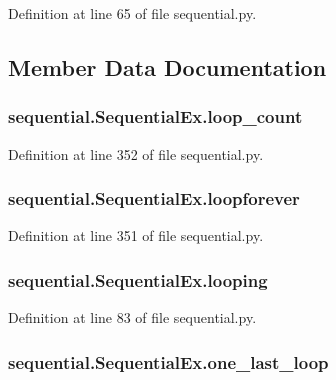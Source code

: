 Definition at line 65 of file sequential.\-py.



\subsection{Member Data Documentation}
\hypertarget{classsequential_1_1SequentialEx_a4ba41b6f01a147966df8df335d570d22}{
\subsubsection[{loop\-\_\-count}]{\setlength{\rightskip}{0pt plus 5cm}sequential.\-Sequential\-Ex.\-loop\-\_\-count}}\label{classsequential_1_1SequentialEx_a4ba41b6f01a147966df8df335d570d22}


Definition at line 352 of file sequential.\-py.

\hypertarget{classsequential_1_1SequentialEx_a8cf719781ed7aa81bb27e30d4281cb66}{
\subsubsection[{loopforever}]{\setlength{\rightskip}{0pt plus 5cm}sequential.\-Sequential\-Ex.\-loopforever}}\label{classsequential_1_1SequentialEx_a8cf719781ed7aa81bb27e30d4281cb66}


Definition at line 351 of file sequential.\-py.

\hypertarget{classsequential_1_1SequentialEx_a548a626b1a098a7ad2e0709fc97fa8f7}{
\subsubsection[{looping}]{\setlength{\rightskip}{0pt plus 5cm}sequential.\-Sequential\-Ex.\-looping}}\label{classsequential_1_1SequentialEx_a548a626b1a098a7ad2e0709fc97fa8f7}


Definition at line 83 of file sequential.\-py.

\hypertarget{classsequential_1_1SequentialEx_a3dbe6e22b44436f3fef2c114550ad8ca}{
\subsubsection[{one\-\_\-last\-\_\-loop}]{\setlength{\rightskip}{0pt plus 5cm}sequential.\-Sequential\-Ex.\-one\-\_\-last\-\_\-loop}}\label{classsequential_1_1SequentialEx_a3dbe6e22b44436f3fef2c114550ad8ca}


